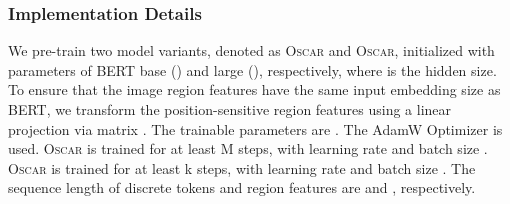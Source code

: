 \documentclass[runningheads]{llncs}
\newcommand{\shortb}{\textsc{Oscar}}
\newcommand{\shortl}{\textsc{Oscar}}
\begin{document}
\begin{comment}
\begin{table}[h]
\begin{center}
\vspace{-5mm}
\scriptsize
\label{tab:pretrain_corpus}
\begin{tabular}{c|c|c|c|c|c|c|c|c}
\toprule
\multirow{2}{*}{Source} & COCO & CC & SBU & Flicker30k & VQA & GQA & VG-QA & Total \\
 & (train) & (all) & (all) & (train) & (train) & (bal-train) & (train) &  \\ 
\midrule
Image/Text & 112k/560k & 3.0M/3.0M & 840k/840k & 29k/145k & 83k/444k & 79k/1026k & 48k/484k & 4.1M/6.5M  \\
\bottomrule
\end{tabular}
\end{center}
\vspace{-5mm}
\end{table}
\end{comment}


\begin{comment}
\begin{table*}[t!]
\begin{center}
\scriptsize
\caption{Statistics of the pre-training corpus.}
\label{tab:pretrain_corpus}
\begin{tabular}{cc}
\multicolumn{2}{c}{\texttt{[image: figs/corpus\_stat.PNG]}} 
\vspace{-5mm}
\end{tabular}
\end{center}
\end{table*}
\end{comment}


\subsubsection{Implementation Details} 
We pre-train two model variants, denoted as \shortb{} and \shortl{}, initialized with parameters  of BERT base () and large (), respectively, where  is the hidden size. 
To ensure that the image region features have the same input embedding size as BERT, we transform the position-sensitive region features using a linear projection via matrix . The trainable parameters are . The AdamW Optimizer is used. \shortb{} is trained for at least M steps, with learning rate  and batch size . \shortl{} is trained for at least k steps, with learning rate  and batch size . The sequence length of discrete tokens  and region features  are  and , respectively. 
\end{document}

